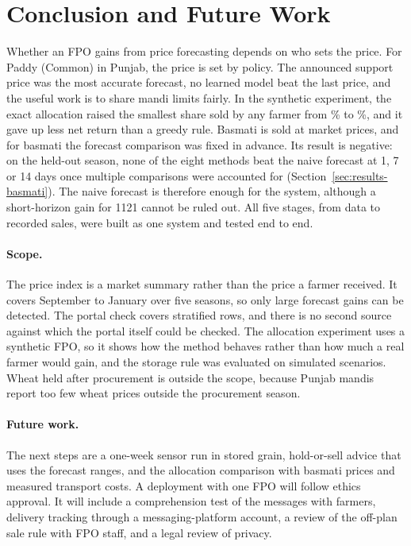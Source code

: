 \section{Conclusion and Future Work}
\label{sec:conclusion}

Whether an FPO gains from price forecasting depends on who sets the price. For Paddy (Common) in Punjab, the price is set by policy.
The announced support price was the most accurate forecast, no learned model beat the last price, and the useful work is to share
mandi limits fairly. In the synthetic experiment, the exact allocation raised the smallest share sold by any farmer from
\% to \%, and it gave up less net return than a greedy
rule. Basmati is sold at market prices, and for basmati the forecast comparison was fixed in advance. Its result is negative: on the
held-out season, none of the eight methods beat the naive forecast at 1, 7 or 14 days once multiple comparisons were accounted for
(Section~\ref{sec:results-basmati}). The naive forecast is therefore enough for the system, although a short-horizon gain for 1121
cannot be ruled out. All five stages, from data to recorded sales, were built as one system and tested end to end.

\paragraph{Scope.} The price index is a market summary rather than the price a farmer received. It covers September to January over
five seasons, so only large forecast gains can be detected. The portal check covers  stratified rows, and there is no second
source against which the portal itself could be checked. The allocation experiment uses a synthetic FPO, so it shows how the method
behaves rather than how much a real farmer would gain, and the storage rule was evaluated on simulated scenarios. Wheat held after
procurement is outside the scope, because Punjab mandis report too few wheat prices outside the procurement season.

\paragraph{Future work.} The next steps are a one-week sensor run in stored grain, hold-or-sell advice that uses the forecast ranges,
and the allocation comparison with basmati prices and measured transport costs. A deployment with one FPO will follow ethics approval.
It will include a comprehension test of the messages with farmers, delivery tracking through a messaging-platform account, a review of
the off-plan sale rule with FPO staff, and a legal review of privacy.
